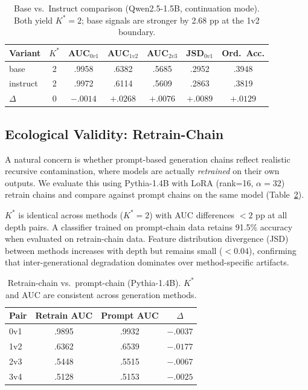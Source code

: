 \documentclass[11pt,a4paper]{article}
\begin{document}
\begin{table}[t]
\centering
\small
\caption{Base vs.\ Instruct comparison (Qwen2.5-1.5B, continuation mode). Both yield $K^*=2$; base signals are stronger by 2.68 pp at the 1v2 boundary.}
\label{tab:base_instruct}
\begin{tabular}{lcccccc}
\toprule
\textbf{Variant} & \textbf{$K^*$} & \textbf{AUC$_{0v1}$} & \textbf{AUC$_{1v2}$} & \textbf{AUC$_{2v3}$} & \textbf{JSD$_{0v1}$} & \textbf{Ord.\ Acc.} \\
\midrule
base & 2 & .9958 & .6382 & .5685 & .2952 & .3948 \\
instruct & 2 & .9972 & .6114 & .5609 & .2863 & .3819 \\
$\Delta$ & 0 & $-.0014$ & $+.0268$ & $+.0076$ & $+.0089$ & $+.0129$ \\
\bottomrule
\end{tabular}
\end{table}

\subsection{Ecological Validity: Retrain-Chain}
\label{sec:retrain}

A natural concern is whether prompt-based generation chains reflect realistic recursive contamination, where models are actually \emph{retrained} on their own outputs.
We evaluate this using Pythia-1.4B with LoRA (rank=16, $\alpha=32$) retrain chains and compare against prompt chains on the same model (Table~\ref{tab:retrain}).

$K^*$ is identical across methods ($K^*=2$) with AUC differences $< 2$ pp at all depth pairs.
A classifier trained on prompt-chain data retains 91.5\% accuracy when evaluated on retrain-chain data.
Feature distribution divergence (JSD) between methods increases with depth but remains small ($< 0.04$), confirming that inter-generational degradation dominates over method-specific artifacts.

\begin{table}[t]
\centering
\small
\caption{Retrain-chain vs.\ prompt-chain (Pythia-1.4B). $K^*$ and AUC are consistent across generation methods.}
\label{tab:retrain}
\begin{tabular}{lccc}
\toprule
\textbf{Pair} & \textbf{Retrain AUC} & \textbf{Prompt AUC} & \textbf{$\Delta$} \\
\midrule
0v1 & .9895 & .9932 & $-.0037$ \\
1v2 & .6362 & .6539 & $-.0177$ \\
2v3 & .5448 & .5515 & $-.0067$ \\
3v4 & .5128 & .5153 & $-.0025$ \\
\bottomrule
\end{tabular}
\end{table}
\end{document}
